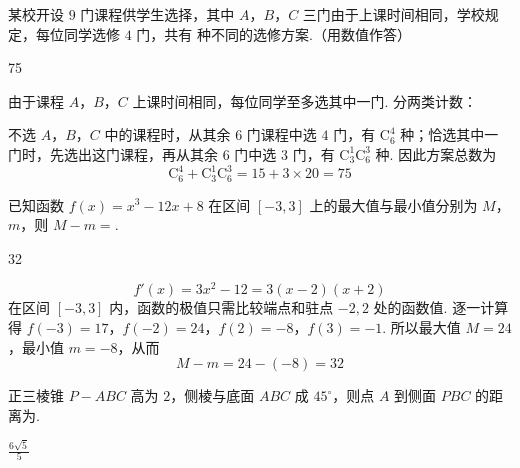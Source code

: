 \begin{problem}
某校开设 \(9\) 门课程供学生选择，其中 \(A\)，\(B\)，\(C\) 三门由于上课时间相同，学校规定，每位同学选修 \(4\) 门，共有\fillinblank{} 种不同的选修方案.（用数值作答）
\end{problem}

\begin{answer}
75
\end{answer}

\begin{solution}
由于课程 \(A\)，\(B\)，\(C\) 上课时间相同，每位同学至多选其中一门. 分两类计数：

不选 \(A\)，\(B\)，\(C\) 中的课程时，从其余 \(6\) 门课程中选 \(4\) 门，有 \(\mathrm C_6^4\) 种；恰选其中一门时，先选出这门课程，再从其余 \(6\) 门中选 \(3\) 门，有 \(\mathrm C_3^1\mathrm C_6^3\) 种. 因此方案总数为
\[
\mathrm C_6^4+\mathrm C_3^1\mathrm C_6^3=15+3\times20=75
\]
\end{solution}

\begin{problem}
已知函数 \(f(x) = x^{3} - 12x + 8\) 在区间 \([-3, 3]\) 上的最大值与最小值分别为 \(M\)，\(m\)，则 \(M - m = \)\fillinblank{}.
\end{problem}

\begin{answer}
32
\end{answer}

\begin{solution}
\[
f'(x)=3x^{2}-12=3(x-2)(x+2)
\]
在区间 \([-3,3]\) 内，函数的极值只需比较端点和驻点 \(-2,2\) 处的函数值. 逐一计算得
\(f(-3)=17\)，\(f(-2)=24\)，\(f(2)=-8\)，\(f(3)=-1\).
所以最大值 \(M=24\)，最小值 \(m=-8\)，从而
\[
M-m=24-(-8)=32
\]
\end{solution}

\begin{problem}
正三棱锥 \(P - ABC\) 高为 \(2\)，侧棱与底面 \(ABC\) 成 \(45^{\circ}\)，则点 \(A\) 到侧面 \(PBC\) 的距离为\fillinblank{}.
\end{problem}

\begin{answer}
\(\frac{6\sqrt{5}}{5}\)
\end{answer}

